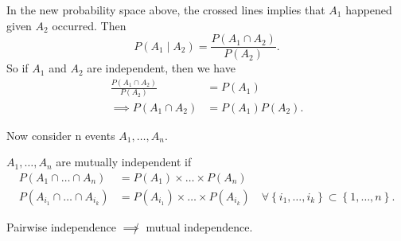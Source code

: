 In the new probability space above, the crossed lines implies that $A_1$ happened given $A_2$ occurred. Then
 \[
	 P\left( A_1 \mid A_2 \right)  = \frac{P\left( A_1 \cap A_2 \right) }{P\left( A_2 \right) }
.\]
So if $A_1$ and $A_2$ are independent, then we have 
\begin{align*}
	\frac{P\left( A_1 \cap A_2 \right) }{P\left( A_2 \right) } &= P\left( A_1 \right)  \\
	\implies P\left( A_1 \cap A_2 \right)  &= P\left( A_1 \right) P\left(A_2 \right) 
.\end{align*}

Now consider n events $A_1, \ldots, A_n$.

\begin{definition}
	$A_1, \ldots, A_{n}$ are mutually independent if 
	\begin{align*}
		P\left( A_1\cap \ldots \cap A_{n} \right) &= P\left( A_1 \right) \times \ldots \times P\left( A_{n} \right) \\
	P\left( A_{i_{1}}\cap \ldots\cap A_{i_{k}}\right)  &= P\left( A_{i_1} \right) \times  \ldots \times  P\left( A_{i_{k}} \right) \quad \forall \left\{i_1,\ldots, i_{k} \right\} \subset  \left\{ 1, \ldots, n \right\} 
	.\end{align*}
\end{definition}
\begin{remark}
	Pairwise independence $\not\implies$  mutual independence. 
\end{remark}
